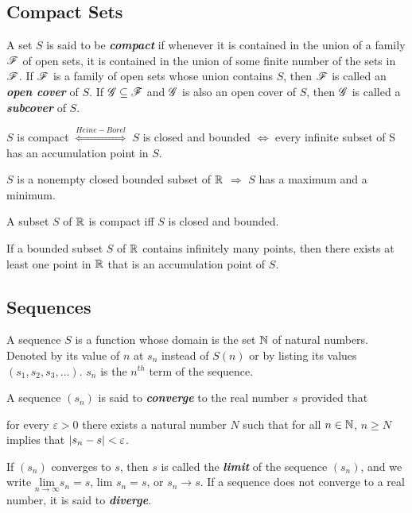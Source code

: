 \documentclass[12pt]{article}
\begin{document}
\subsection{Compact Sets}
\label{sec:org8e75d45}
\begin{definition}
  A set $S$ is said to be \textit{\textbf{compact}} if whenever it is
  contained in the union of a family $\mathscr{F}$ of open sets, it is contained in
  the union of some finite number of the sets in $\mathscr{F}$. If $\mathscr{F}$ is a family of
  open sets whose union contains $S$, then $\mathscr{F}$ is called an
  \textit{\textbf{open cover}} of $S$. If $\mathscr{G} \subseteq \mathscr{F}$ and $\mathscr{G}$ is also an open
  cover of $S$, then $\mathscr{G}$ is called a \textit{\textbf{subcover}} of $S$.

  \begin{corollary}
      $S$ is compact $\overset{Heine-Borel}{\iff}$ $S$ is closed and bounded
      $\iff$ every infinite subset of S has an accumulation point in $S$.

      $S$ is a nonempty closed bounded subset of $\mathbb{R}$ $\Rightarrow$ $S$ has a maximum
      and a minimum.
  \end{corollary}
\end{definition}

\begin{definition}
  A subset $S$ of $\mathbb{R}$ is compact iff $S$ is closed and bounded.
\end{definition}

\begin{definition}
  If a bounded subset $S$ of $\mathbb{R}$ contains infinitely many points, then there
  exists at least one point in $\mathbb{R}$ that is an accumulation point of $S$.
\end{definition}

\subsection{Sequences}
\label{sec:org579f6fd}
\begin{definition}[Sequence]
  A sequence $S$ is a function whose domain is the set $\mathbb{N}$ of natural
  numbers. Denoted by its value of $n$ at $s_n$ instead of $S(n)$ or by listing
  its values $(s_1, s_2, s_3, ...)$. $s_n$ is the $n^{th}$ term of the sequence.
\end{definition}

\begin{definition}
  A sequence $(s_n)$ is said to \textbf{\textit{converge}} to the real number
  $s$ provided that
  \begin{center}
    for every $\varepsilon > 0$ there exists a natural number $N$ such that for
    all $n \in \mathbb{N}$, $n \ge N$ implies that $\left|s_n - s\right| < \varepsilon$.
  \end{center}
  If $(s_n)$ converges to $s$, then $s$ is called the \textbf{\textit{limit}}
  of the sequence $(s_n)$, and we write $\underset{n\rightarrow\infty}{\text{lim}} s_n = s$,
  lim $s_n = s$, or $s_n \rightarrow s$. If a sequence does not converge to a real
  number, it is said to \textbf{\textit{diverge}}.
\end{definition}
\end{document}
